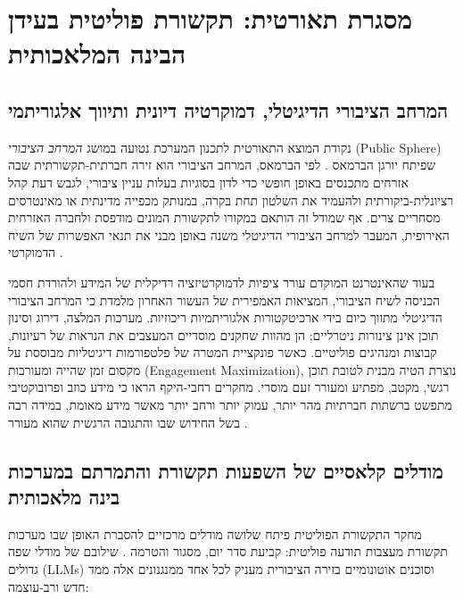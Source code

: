 
\section{מסגרת תאורטית: תקשורת פוליטית בעידן הבינה המלאכותית}
\label{sec:political-communication}

\subsection{המרחב הציבורי הדיגיטלי, דמוקרטיה דיונית ותיווך אלגוריתמי}
נקודת המוצא התאורטית לתכנון המערכת נטועה במושג \emph{המרחב הציבורי} (Public Sphere) שפיתח יורגן הברמאס \cite{habermas1989structural}. לפי הברמאס, המרחב הציבורי הוא זירה חברתית-תקשורתית שבה אזרחים מתכנסים באופן חופשי כדי לדון בסוגיות בעלות עניין ציבורי, לגבש דעת קהל רציונלית-ביקורתית ולהעמיד את השלטון תחת בקרה, במנותק מכפייה מדינתית או מאינטרסים מסחריים צרים. אף שמודל זה הותאם במקורו לתקשורת המונים מודפסת ולחברה האזרחית האירופית, המעבר למרחב הציבורי הדיגיטלי משנה באופן מבני את תנאי האפשרות של השיח הדמוקרטי \cite{dahlberg2011reconstructing}.

בעוד שהאינטרנט המוקדם עורר ציפיות לדמוקרטיזציה רדיקלית של המידע ולהורדת חסמי הכניסה לשיח הציבורי, המציאות האמפירית של העשור האחרון מלמדת כי המרחב הציבורי הדיגיטלי מתווך כיום בידי ארכיטקטורות אלגוריתמיות ריכוזיות. מערכות המלצה, דירוג וסינון תוכן אינן צינורות ניטרליים; הן מהוות שחקנים מוסדיים המעצבים את הנראות של רעיונות, קבוצות ומנהיגים פוליטיים. כאשר פונקציית המטרה של פלטפורמות דיגיטליות מבוססת על מקסום זמן שהייה ומעורבות (Engagement Maximization), נוצרת הטיה מבנית לטובת תוכן רגשי, מקטב, מפתיע ומעורר זעם מוסרי. מחקרים רחבי-היקף הראו כי מידע כוזב ופרובוקטיבי מתפשט ברשתות חברתיות מהר יותר, עמוק יותר ורחב יותר מאשר מידע מאומת, במידה רבה בשל החידוש שבו והתגובה הרגשית שהוא מעורר \cite{vosoughi2018spread}.

\subsection{מודלים קלאסיים של השפעות תקשורת והתמרתם במערכות בינה מלאכותית}
מחקר התקשורת הפוליטית פיתח שלושה מודלים מרכזיים להסברת האופן שבו מערכות תקשורת מעצבות תודעה פוליטית: קביעת סדר יום, מסגור והטרמה \cite{scheufele2007framing}. שילובם של מודלי שפה גדולים (LLMs) וסוכנים אוטונומיים בזירה הציבורית מעניק לכל אחד ממנגנונים אלה ממד חדש ורב-עוצמה:

